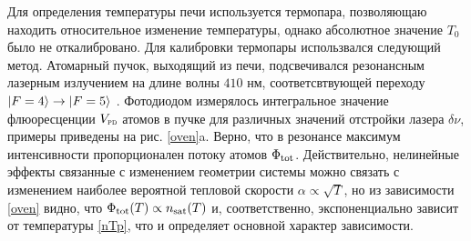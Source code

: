 Для определения температуры печи используется термопара, позволяющаю находить относительное изменение температуры, однако абсолютное значение $T_0$ было не откалибровано. Для калибровки термопары использвался следующий метод. Атомарный пучок, выходящий из печи, подсвечивался резонансным лазерным излучением на длине волны $410$ нм, соответсвтвующей переходу $\left| F=4 \right\rangle \to \left| F=5 \right\rangle$ \cite{vlad}. Фотодиодом измерялось интегральное значение флюоресценции  $\subt{V}{PD}$ атомов в пучке для различных значений отстройки лазера $\delta \nu$, примеры приведены на рис. \ref{oven}a. Верно, что в резонансе максимум интенсивности пропорционален потоку атомов $\Phi_{\textnormal{tot}}$. Действительно, нелинейные эффекты связанные с изменением геометрии системы можно связать с изменением наиболее вероятной тепловой скорости $\alpha \propto \sqrt{T}$, но из зависимости \eqref{oven} видно, что $\Phi_{\textnormal{tot}}(T) \propto n_{\textnormal{sat}}(T)$ и, соответственно, экспоненциально зависит от температуры \eqref{nTp}, что и определяет основной характер зависимости. 


